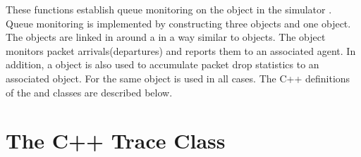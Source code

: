 These functions establish queue monitoring on the  object
in the simulator .
Queue monitoring is implemented by constructing three 
objects and one  object.
The  objects are linked in around a  in a way
similar to  objects.
The  object monitors packet arrivals(departures)
and reports them to an associated  agent.
In addition, a  object is also used to accumulate
packet drop statistics to an associated  object.
For  the same  object is used
in all cases.
The C++ definitions of the  and 
classes are described below.

\section{The C++ Trace Class}
\label{sec:tracemoncplus}

